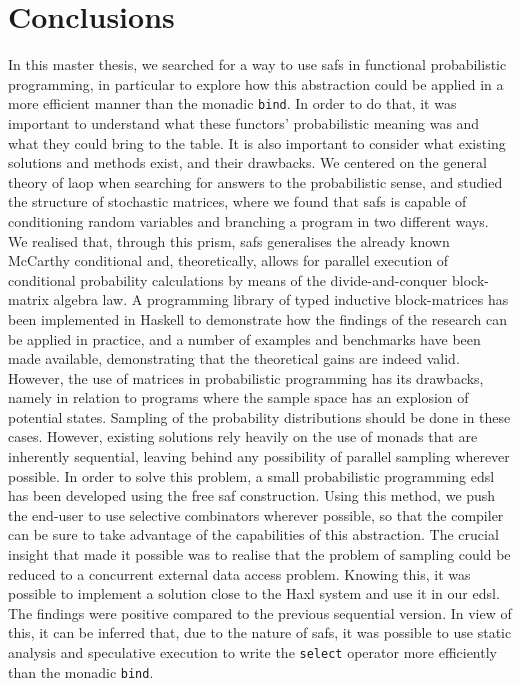 \documentclass[
  oneside,
  11pt, a4paper,
  footinclude=true,
  headinclude=true,
  cleardoublepage=empty
]{scrbook}
\theoremstyle{definition}
\theoremstyle{definition}
\begin{document}
	    \section{Conclusions}
	        In this master thesis, we searched for a way to use \glspl{saf} in functional probabilistic programming, in particular to explore how this abstraction could be applied in a more efficient manner than the monadic \texttt{bind}. In order to do that, it was important to understand what these functors' probabilistic meaning was and what they could bring to the table. It is also important to consider what existing solutions and methods exist, and their drawbacks. We centered on the general theory of \gls{laop} when searching for answers to the probabilistic sense, and studied the structure of stochastic matrices, where we found that \glspl{saf} is capable of conditioning random variables and branching a program in two different ways. We realised that, through this prism, \glspl{saf} generalises the already known McCarthy conditional and, theoretically, allows for parallel execution of conditional probability calculations by means of the divide-and-conquer block-matrix algebra law. A programming library of typed inductive block-matrices has been implemented in Haskell to demonstrate how the findings of the research can be applied in practice, and a number of examples and benchmarks have been made available, demonstrating that the theoretical gains are indeed valid. However, the use of matrices in probabilistic programming has its drawbacks, namely in relation to programs where the sample space has an explosion of potential states. Sampling of the probability distributions should be done in these cases. However, existing solutions rely heavily on the use of monads that are inherently sequential, leaving behind any possibility of parallel sampling wherever possible. In order to solve this problem, a small probabilistic programming \gls{edsl} has been developed using the free \gls{saf} construction. Using this method, we push the end-user to use selective combinators wherever possible, so that the compiler can be sure to take advantage of the capabilities of this abstraction. The crucial insight that made it possible was to realise that the problem of sampling could be reduced to a concurrent external data access problem. Knowing this, it was possible to implement a solution close to the Haxl system and use it in our \gls{edsl}. The findings were positive compared to the previous sequential version. In view of this, it can be inferred that, due to the nature of \glspl{saf}, it was possible to use static analysis and speculative execution to write the \texttt{select} operator more efficiently than the monadic \texttt{bind}.
	        
\end{document}
